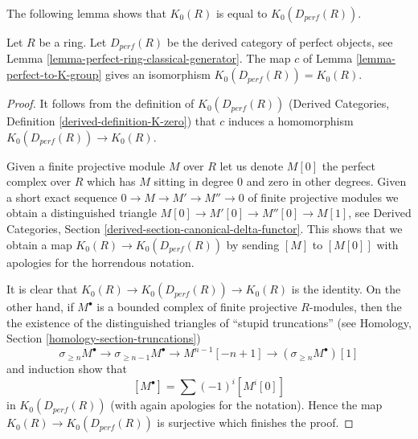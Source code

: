 \noindent
The following lemma shows that $K_0(R)$ is equal to
$K_0(D_{perf}(R))$.

\begin{lemma}
\label{lemma-perfect-to-K-group-universal}
Let $R$ be a ring. Let $D_{perf}(R)$ be the derived category of
perfect objects, see Lemma \ref{lemma-perfect-ring-classical-generator}.
The map $c$ of Lemma \ref{lemma-perfect-to-K-group} gives an isomorphism
$K_0(D_{perf}(R)) = K_0(R)$.
\end{lemma}

\begin{proof}
It follows from the definition of $K_0(D_{perf}(R))$
(Derived Categories, Definition \ref{derived-definition-K-zero})
that $c$ induces a homomorphism $K_0(D_{perf}(R)) \to K_0(R)$.

\medskip\noindent
Given a finite projective module $M$ over $R$ let us denote
$M[0]$ the perfect complex over $R$ which has $M$ sitting in degree $0$
and zero in other degrees. Given a short exact sequence
$0 \to M \to M' \to M'' \to 0$ of finite projective modules
we obtain a distinguished triangle $M[0] \to M'[0] \to M''[0] \to M[1]$, see
Derived Categories, Section \ref{derived-section-canonical-delta-functor}.
This shows that we obtain a map $K_0(R) \to K_0(D_{perf}(R))$
by sending $[M]$ to $[M[0]]$ with apologies for the horrendous notation.

\medskip\noindent
It is clear that $K_0(R) \to K_0(D_{perf}(R)) \to K_0(R)$ is the identity.
On the other hand, if $M^\bullet$ is a bounded complex of finite projective
$R$-modules, then the the existence of the distinguished triangles
of ``stupid truncations''
(see Homology, Section \ref{homology-section-truncations})
$$
\sigma_{\geq n}M^\bullet \to \sigma_{\geq n - 1}M^\bullet \to
M^{n - 1}[-n + 1] \to (\sigma_{\geq n}M^\bullet)[1]
$$
and induction show that
$$
[M^\bullet] = \sum (-1)^i[M^i[0]]
$$
in $K_0(D_{perf}(R))$ (with again apologies for the notation).
Hence the map $K_0(R) \to K_0(D_{perf}(R))$ is surjective which
finishes the proof.
\end{proof}







